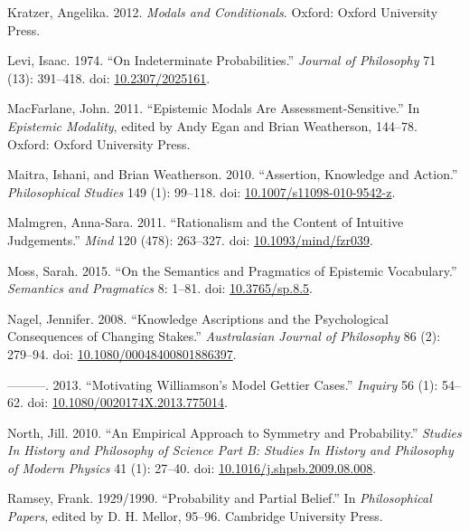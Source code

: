 \documentclass[
  11pt,
  letterpaper,
  DIV=11,
  numbers=noendperiod,
  twoside]{scrartcl}
\newlength{\cslhangindent}
\newenvironment{CSLReferences}[2] %
 {\begin{list}{}{%
  \setlength{\itemindent}{0pt}
  \setlength{\leftmargin}{0pt}
  \setlength{\parsep}{0pt}
  \ifodd #1
   \setlength{\leftmargin}{\cslhangindent}
   \setlength{\itemindent}{-1\cslhangindent}
  \fi
  \setlength{\itemsep}{#2\baselineskip}}}
 {\end{list}}
\begin{document}
\begin{CSLReferences}{1}{0}
Kratzer, Angelika. 2012. \emph{Modals and Conditionals}. Oxford: Oxford
University Press.

Levi, Isaac. 1974. {``On Indeterminate Probabilities.''} \emph{Journal
of Philosophy} 71 (13): 391--418. doi:
\href{https://doi.org/10.2307/2025161}{10.2307/2025161}.

MacFarlane, John. 2011. {``Epistemic Modals Are Assessment-Sensitive.''}
In \emph{Epistemic Modality}, edited by Andy Egan and Brian Weatherson,
144--78. Oxford: Oxford University Press.

Maitra, Ishani, and Brian Weatherson. 2010. {``Assertion, Knowledge and
Action.''} \emph{Philosophical Studies} 149 (1): 99--118. doi:
\href{https://doi.org/10.1007/s11098-010-9542-z}{10.1007/s11098-010-9542-z}.

Malmgren, Anna-Sara. 2011. {``Rationalism and the Content of Intuitive
Judgements.''} \emph{Mind} 120 (478): 263--327. doi:
\href{https://doi.org/10.1093/mind/fzr039}{10.1093/mind/fzr039}.

Moss, Sarah. 2015. {``On the Semantics and Pragmatics of Epistemic
Vocabulary.''} \emph{Semantics and Pragmatics} 8: 1--81. doi:
\href{https://doi.org/10.3765/sp.8.5}{10.3765/sp.8.5}.

Nagel, Jennifer. 2008. {``Knowledge Ascriptions and the Psychological
Consequences of Changing Stakes.''} \emph{Australasian Journal of
Philosophy} 86 (2): 279--94. doi:
\href{https://doi.org/10.1080/00048400801886397}{10.1080/00048400801886397}.

---------. 2013. {``Motivating Williamson's Model Gettier Cases.''}
\emph{Inquiry} 56 (1): 54--62. doi:
\href{https://doi.org/10.1080/0020174X.2013.775014}{10.1080/0020174X.2013.775014}.

North, Jill. 2010. {``An Empirical Approach to Symmetry and
Probability.''} \emph{Studies In History and Philosophy of Science Part
B: Studies In History and Philosophy of Modern Physics} 41 (1): 27--40.
doi:
\href{https://doi.org/10.1016/j.shpsb.2009.08.008}{10.1016/j.shpsb.2009.08.008}.

Ramsey, Frank. 1929/1990. {``Probability and Partial Belief.''} In
\emph{Philosophical Papers}, edited by D. H. Mellor, 95--96. Cambridge
University Press.


\end{CSLReferences}
\end{document}

